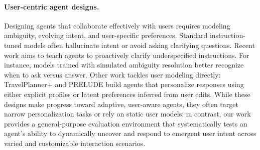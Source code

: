 \paragraph{User-centric agent designs.}  
Designing agents that collaborate effectively with users requires modeling ambiguity, evolving intent, and user-specific preferences. Standard instruction-tuned models often hallucinate intent or avoid asking clarifying questions. Recent work aims to teach agents to proactively clarify underspecified instructions. For instance, models trained with simulated ambiguity resolution \citep{zhang2024clarify, chen2025act} better recognize when to ask versus answer. Other work tackles user modeling directly: TravelPlanner+ \citep{singh2024personal} and PRELUDE \citep{gao2024prelude} build agents that personalize responses using either explicit profiles or latent preferences inferred from user edits. While these designs make progress toward adaptive, user-aware agents, they often target narrow personalization tasks or rely on static user models; in contrast, our work provides a general-purpose evaluation environment that systematically tests an agent’s ability to dynamically uncover and respond to emergent user intent across varied and customizable interaction scenarios.
